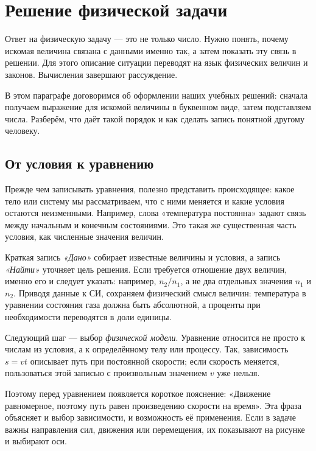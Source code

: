 \section{Решение физической задачи}

Ответ на физическую задачу — это не только число. Нужно понять, почему
искомая величина связана с данными именно так, а затем показать эту связь
в решении. Для этого описание ситуации переводят на язык физических
величин и законов. Вычисления завершают рассуждение.

В этом параграфе договоримся об оформлении наших учебных решений:
сначала получаем выражение для искомой величины в буквенном виде,
затем подставляем числа. Разберём, что даёт такой порядок и как сделать
запись понятной другому человеку.

\subsection{От условия к уравнению}

Прежде чем записывать уравнения, полезно представить происходящее:
какое тело или систему мы рассматриваем, что с ними меняется и какие
условия остаются неизменными. Например, слова «температура постоянна»
задают связь между начальным и конечным состояниями. Это такая же
существенная часть условия, как численные значения величин.

Краткая запись \textit{«Дано»} собирает известные величины и условия,
а запись \textit{«Найти»} уточняет цель решения. Если требуется отношение
двух величин, именно его и следует указать: например, $n_2/n_1$, а не
два отдельных значения $n_1$ и $n_2$. Приводя данные к СИ, сохраняем
физический смысл величин: температура в уравнении состояния газа
должна быть абсолютной, а проценты при необходимости переводятся
в доли единицы.

Следующий шаг — выбор \textit{физической модели}. Уравнение относится
не просто к числам из условия, а к определённому телу или процессу.
Так, зависимость $s=vt$ описывает путь при постоянной скорости;
если скорость меняется, пользоваться этой записью с произвольным
значением $v$ уже нельзя.

Поэтому перед уравнением появляется короткое пояснение:
«Движение равномерное, поэтому путь равен произведению скорости
на время». Эта фраза объясняет и выбор зависимости, и возможность
её применения. Если в задаче важны направления сил, движения или
перемещения, их показывают на рисунке и выбирают оси.

